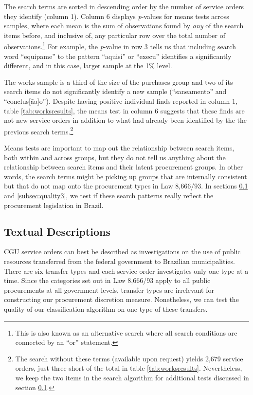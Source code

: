 \documentclass[11pt]{article}
\begin{document}
The search terms are sorted in descending order by the number of service orders they identify (column 1). Column 6 displays \emph{p}-values for means tests across samples, where each mean is the sum of observations found by \emph{any} of the search items before, and inclusive of, any particular row over the total number of observations.\footnote{This is also known as an alternative search where all search conditions are connected by an ``or'' statement.} For example, the \emph{p}-value in row 3 tells us that including search word ``equipame'' to the pattern ``aquisi'' or ``execu'' identifies a significantly different, and in this case, larger sample at the 1\% level.

The works sample is a third of the size of the purchases group and two of its search items do not significantly identify a new sample (``saneamento'' and ``conclus{[}ãa{]}o''). Despite having positive individual finds reported in column 1, table \ref{tab:worksresults}, the means test in column 6 suggests that these finds are not new service orders in addition to what had already been identified by the the previous search terms.\footnote{The search without these terms (available upon request) yields 2,679 service orders, just three short of the total in table \ref{tab:worksresults}. Nevertheless, we keep the two items in the search algorithm for additional tests discussed in section \ref{subsec:quality2}.}


Means tests are important to map out the relationship between search items, both within and across groups, but they do not tell us anything about the relationship between search items and their latent procurement groups. In other words, the search terms might be picking up groups that are internally consistent but that do not map onto the procurement types in Law 8,666/93. In sections \ref{subsec:quality2} and \ref{subsec:quality3}, we test if these search patterns really reflect the procurement legislation in Brazil.

\subsection{Textual Descriptions}\label{subsec:quality2}

CGU service orders can best be described as investigations on the use of
public resources transferred from the federal government to Brazilian
municipalities. There are six transfer types and each service order
investigates only one type at a time. Since the categories
set out in Law 8,666/93 apply to all public procurements at all
government levels, transfer types are irrelevant for constructing our
procurement discretion measure. Nonetheless, we can test the quality of our classification algorithm on one type of these transfers.
\end{document}

